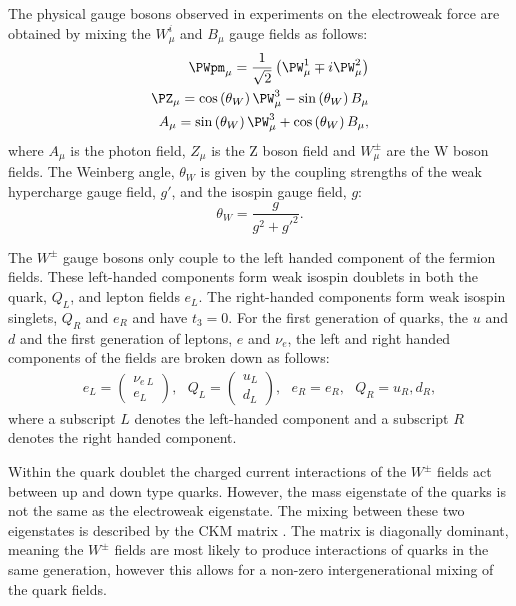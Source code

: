 The physical gauge bosons observed in experiments on the electroweak
force are obtained by mixing the $W_{\mu}^i$ and $B_{\mu}$ gauge
fields as follows:
\begin{equation}
  \begin{split}
  \PWpm_{\mu}=\frac{1}{\sqrt{2}}\left(\PW^{1}_{\mu}\mp i\PW^{2}_{\mu}\right) \\
  \PZ_{\mu}=\cos\left(\theta_{W}\right)\PW^{3}_{\mu}-\sin\left(\theta_{W}\right)B_{\mu} \\
  A_{\mu}=\sin\left(\theta_{W}\right)\PW^{3}_{\mu}+\cos\left(\theta_{W}\right)B_{\mu},
  \end{split}
\end{equation}
where $A_{\mu}$ is the photon field, $Z_{\mu}$ is the Z boson field
and $W^{\pm}_{\mu}$ are the W boson fields. The Weinberg angle,
$\theta_W$ is given by the coupling strengths of the weak hypercharge
gauge field, $g'$, and the isospin gauge field, $g$:
\begin{equation}
\theta_W = \frac{g}{g^2+g'^2}.
\end{equation}

The $W^{\pm}$ gauge bosons only couple to the left handed component of
the fermion fields. These left-handed components form weak isospin
doublets in both the quark, $Q_L$, and lepton fields $e_L$. The
right-handed components form weak isospin singlets, $Q_R$ and $e_R$
and have $t_3=0$. For the first generation of quarks, the $u$ and $d$
and the first generation of leptons, $e$ and $\nu_e$, the left and
right handed components of the fields are broken down as follows:
\begin{equation}
  \begin{split}
  e_L=\left(\begin{array}{c} \nu_{e~L} \\
  e_L\end{array}\right),~~~
  Q_L=\left(\begin{array}{c} u_L \\
  d_L\end{array}\right),~~~e_R=e_R,~~~Q_R=u_R,d_R,
  \end{split}
\end{equation}
where a subscript $L$ denotes the left-handed component and a
subscript $R$ denotes the right handed component.

Within the quark doublet the charged current interactions of the
$W^{\pm}$ fields act between up and down type quarks. However, the
mass eigenstate of the quarks is not the same as the electroweak
eigenstate. The mixing between these two eigenstates is described by
the \ac{CKM} matrix \cite{Kobayashi:1973fv}. The matrix is diagonally
dominant, meaning the $W^{\pm}$ fields are most likely to produce
interactions of quarks in the same generation, however this allows for
a non-zero intergenerational mixing of the quark fields.

